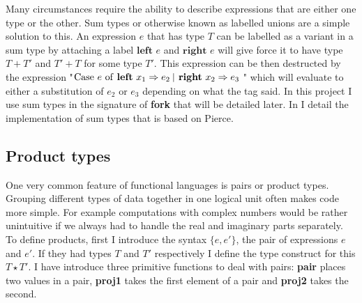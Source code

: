 \documentclass[12pt,twoside,notitlepage]{report}
\begin{document}
Many circumstances require the ability to describe expressions that are either one type or the other. Sum types or otherwise known as labelled unions are a simple solution to this. An expression $ e $ that has type $ T $ can be labelled as a variant in a sum type by attaching a label $ \textbf{left } e $ and $ \textbf{right } e $ will give force it to have type $ T + T' $ and $ T' + T $ for some type $ T' $. This expression can be then destructed by the expression "$ \textrm{Case $  e $ of \textbf{left} $ x_1 \Rightarrow e_2 $ \vline\, \textbf{right} $ x_2 \Rightarrow e_3 $ } $" which will evaluate to either a substitution of $ e_2 $ or $ e_3 $ depending on what the tag said. In this project I use sum types in the signature of \textbf{fork} that will be detailed later. In  I detail the implementation of sum types that is based on Pierce\cite[p.~132]{pierce2002types}. 
\subsection{Product types}
One very common feature of functional languages is pairs or product types. Grouping different types of data together in one logical unit often makes code more simple. For example computations with complex numbers would be rather unintuitive if we always had to handle the real and imaginary parts separately. To define products, first I introduce the syntax $ \{e, e' \} $, the pair of expressions $ e $ and $ e' $. If they had types $ T $ and $ T' $ respectively I define the type construct for this $ T\star T' $. I have introduce three primitive functions to deal with pairs: \textbf{pair} places two values in a pair, \textbf{proj1} takes the first element of a pair and \textbf{proj2} takes the second.
\end{document}
